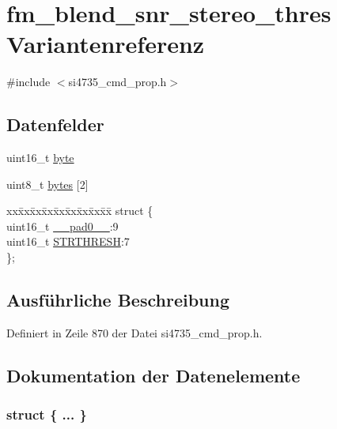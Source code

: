 \hypertarget{unionfm__blend__snr__stereo__thres}{}\section{fm\+\_\+blend\+\_\+snr\+\_\+stereo\+\_\+thres Variantenreferenz}
\label{unionfm__blend__snr__stereo__thres}


{\ttfamily \#include $<$si4735\+\_\+cmd\+\_\+prop.\+h$>$}

\subsection*{Datenfelder}
\begin{DoxyCompactItemize}
\item 
uint16\+\_\+t \hyperlink{unionfm__blend__snr__stereo__thres_ab0549c1b5ea980a02e7eab77e21fea49}{byte}
\item 
uint8\+\_\+t \hyperlink{unionfm__blend__snr__stereo__thres_a46e4c05d20a047ec169f60d3167e912e}{bytes} \mbox{[}2\mbox{]}
\item 
\begin{tabbing}
xx\=xx\=xx\=xx\=xx\=xx\=xx\=xx\=xx\=\kill
struct \{\\
\>uint16\_t \hyperlink{unionfm__blend__snr__stereo__thres_a77132c2c26a75f5b8751b235cda23828}{\_\_pad0\_\_}:9\\
\>uint16\_t \hyperlink{unionfm__blend__snr__stereo__thres_ae59cc6ed2c20ceb75c5065984e1751d1}{STRTHRESH}:7\\
\}; \\

\end{tabbing}\end{DoxyCompactItemize}


\subsection{Ausführliche Beschreibung}


Definiert in Zeile 870 der Datei si4735\+\_\+cmd\+\_\+prop.\+h.



\subsection{Dokumentation der Datenelemente}
\hypertarget{unionfm__blend__snr__stereo__thres_accd50b50695affa6b909156a034ba133}{}\subsubsection[{"@107}]{\setlength{\rightskip}{0pt plus 5cm}struct \{ ... \} }\label{unionfm__blend__snr__stereo__thres_accd50b50695affa6b909156a034ba133}
\hypertarget{unionfm__blend__snr__stereo__thres_a77132c2c26a75f5b8751b235cda23828}{}
